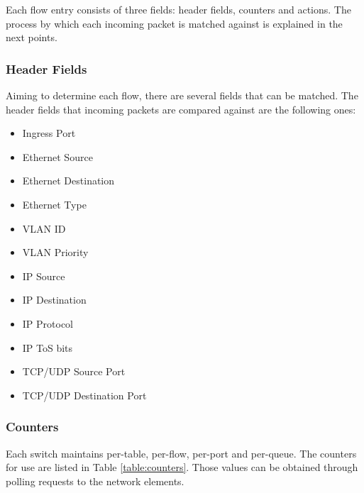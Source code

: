 Each flow entry consists of three fields: header fields, counters and actions. The process by which each incoming packet is matched against is explained in the next points.

\subsubsection{Header Fields}

Aiming to determine each flow, there are several fields that can be matched. The header fields that incoming packets are compared against are the following ones:

\begin{itemize}
\item Ingress Port
\item Ethernet Source
\item Ethernet Destination
\item Ethernet Type
\item VLAN ID
\item VLAN Priority
\item IP Source
\item IP Destination
\item IP Protocol
\item IP ToS bits
\item TCP/UDP Source Port
\item TCP/UDP Destination Port
\end{itemize}

\subsubsection{Counters}

Each switch maintains per-table, per-flow, per-port and per-queue. The counters for use are listed in Table \ref{table:counters}. Those values can be obtained through polling requests to the network elements.

